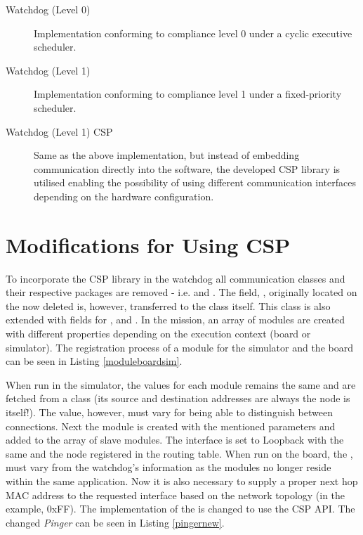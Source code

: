 \begin{description}
	\item[Watchdog (Level 0)] Implementation conforming to compliance level 0 under a cyclic executive scheduler.
	\item[Watchdog (Level 1)] Implementation conforming to compliance level 1 under a fixed-priority scheduler. 
	\item[Watchdog (Level 1) CSP] Same as the above implementation, but instead of embedding \iic communication directly into the software, the developed CSP library is utilised enabling the possibility of using different communication interfaces depending on the hardware configuration.
\end{description}

\section{Modifications for Using CSP}
To incorporate the CSP library in the watchdog all communication classes and their respective packages are removed - i.e.  and . The field, , originally located on the now deleted  is, however, transferred to the  class itself. This class is also extended with fields for ,  and . In the mission, an array of modules are created with different properties depending on the execution context (board or simulator). The registration process of a module for the simulator and the board can be seen in Listing \ref{moduleboardsim}.



When run in the simulator, the   values for each module remains the same and are fetched from a  class (its source and destination addresses are always the node is itself!). The  value, however, must vary for being able to distinguish between connections. Next the module is created with the mentioned parameters and added to the array of slave modules. The interface is set to Loopback with the same  and the node registered in the routing table. When run on the board, the ,  must vary from the watchdog's information as the modules no longer reside within the same application. Now it is also necessary to supply a proper next hop MAC address to the requested interface based on the network topology (in the example, 0xFF). The implementation of the  is changed to use the CSP API. The changed \textit{Pinger} can be seen in Listing \ref{pingernew}.


